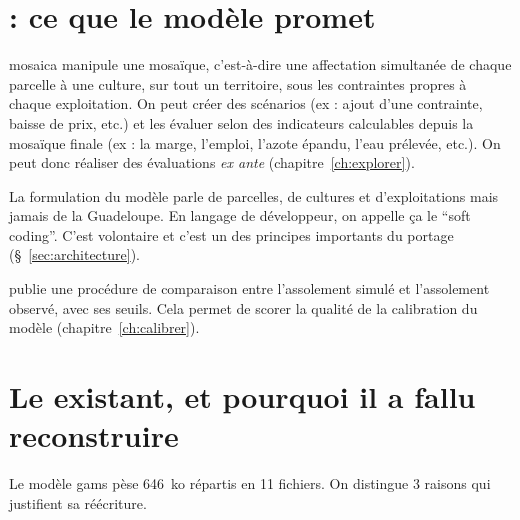 \section{ : ce que le modèle promet}
\label{sec:mosaica}

\gls{mosaica} manipule une mosaïque, c'est-à-dire une affectation simultanée de chaque parcelle
à une culture, sur tout un territoire, sous les contraintes propres à chaque exploitation. On
peut créer des scénarios (ex : ajout d'une contrainte, baisse de prix, etc.) et les évaluer
selon des indicateurs calculables depuis la mosaïque finale (ex : la marge, l'emploi, l'azote
épandu, l'eau prélevée, etc.). On peut donc réaliser des évaluations \emph{ex ante}
(chapitre~\ref{ch:explorer}).

La formulation du modèle parle de parcelles, de cultures et d'exploitations mais jamais de la
Guadeloupe. En langage de développeur, on appelle ça le \enquote{soft coding}. C'est volontaire
et c'est un des principes importants du portage (§~\ref{sec:architecture}).

\textcite[§~2.6]{chopin2015} publie une procédure de comparaison entre l'assolement simulé et
l'assolement observé, avec ses seuils. Cela permet de scorer la qualité de la calibration du
modèle (chapitre~\ref{ch:calibrer}).

\section{Le  existant, et pourquoi il a fallu reconstruire}
\label{sec:gams}

Le modèle \gls{gams} pèse \num{646}~ko répartis en \num{11} fichiers. On distingue
\num{3} raisons qui justifient sa réécriture.

